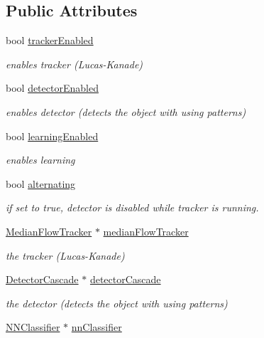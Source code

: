 \subsection*{Public Attributes}
\begin{DoxyCompactItemize}
\item 
bool \hyperlink{classtld_1_1TLD_ab94fab1f55f6ef122c9e3fcf4747ac50}{tracker\-Enabled}
\begin{DoxyCompactList}\small\item\em enables tracker (Lucas-\/\-Kanade) \end{DoxyCompactList}\item 
bool \hyperlink{classtld_1_1TLD_a925a0be8c0b83bcb8c2c91a046c7db1b}{detector\-Enabled}
\begin{DoxyCompactList}\small\item\em enables detector (detects the object with using patterns) \end{DoxyCompactList}\item 
bool \hyperlink{classtld_1_1TLD_a86422799478881dd711d0a78444be245}{learning\-Enabled}
\begin{DoxyCompactList}\small\item\em enables learning \end{DoxyCompactList}\item 
bool \hyperlink{classtld_1_1TLD_a873bb61492173098b134d94239ef0ba4}{alternating}
\begin{DoxyCompactList}\small\item\em if set to true, detector is disabled while tracker is running. \end{DoxyCompactList}\item 
\hyperlink{classtld_1_1MedianFlowTracker}{Median\-Flow\-Tracker} $\ast$ \hyperlink{classtld_1_1TLD_a8b523afaefa5fbd9bc86fd656b87e1c0}{median\-Flow\-Tracker}
\begin{DoxyCompactList}\small\item\em the tracker (Lucas-\/\-Kanade) \end{DoxyCompactList}\item 
\hyperlink{classtld_1_1DetectorCascade}{Detector\-Cascade} $\ast$ \hyperlink{classtld_1_1TLD_abe59bf99d46b55f6ef402cb48f9d290b}{detector\-Cascade}
\begin{DoxyCompactList}\small\item\em the detector (detects the object with using patterns) \end{DoxyCompactList}\item 
\hyperlink{classtld_1_1NNClassifier}{N\-N\-Classifier} $\ast$ \hyperlink{classtld_1_1TLD_a98a1be08a4b630d85e5e60dc4bb78b13}{nn\-Classifier}

\end{DoxyCompactItemize}
